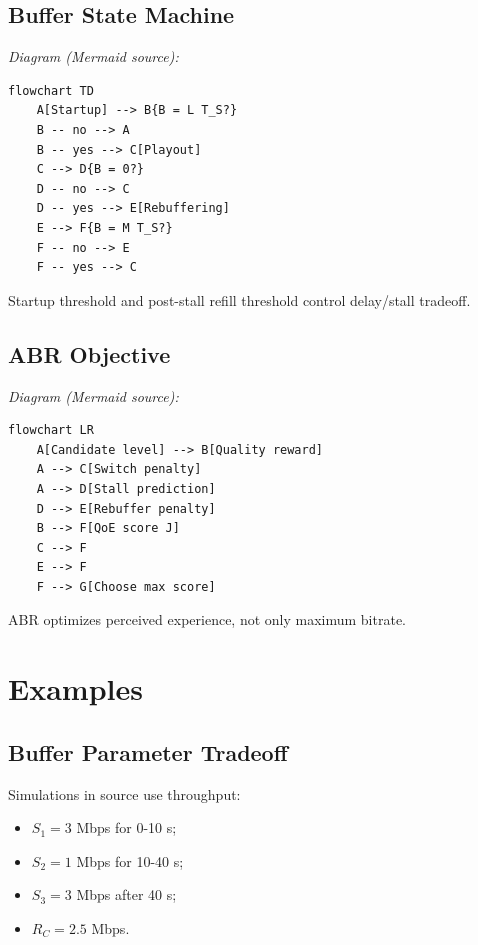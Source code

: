 \subsection{Buffer State Machine}

\begin{center}\footnotesize\itshape Diagram (Mermaid source):\end{center}
\begin{verbatim}
flowchart TD
    A[Startup] --> B{B = L T_S?}
    B -- no --> A
    B -- yes --> C[Playout]
    C --> D{B = 0?}
    D -- no --> C
    D -- yes --> E[Rebuffering]
    E --> F{B = M T_S?}
    F -- no --> E
    F -- yes --> C
\end{verbatim}

Startup threshold and post-stall refill threshold control delay/stall tradeoff.

\subsection{ABR Objective}

\begin{center}\footnotesize\itshape Diagram (Mermaid source):\end{center}
\begin{verbatim}
flowchart LR
    A[Candidate level] --> B[Quality reward]
    A --> C[Switch penalty]
    A --> D[Stall prediction]
    D --> E[Rebuffer penalty]
    B --> F[QoE score J]
    C --> F
    E --> F
    F --> G[Choose max score]
\end{verbatim}

ABR optimizes perceived experience, not only maximum bitrate.

\section{Examples}

\subsection{Buffer Parameter Tradeoff}

Simulations in source use throughput:

\begin{itemize}
  \item $S_1=3$ Mbps for 0-10 s;
  \item $S_2=1$ Mbps for 10-40 s;
  \item $S_3=3$ Mbps after 40 s;
  \item $R_C=2.5$ Mbps.
\end{itemize}

